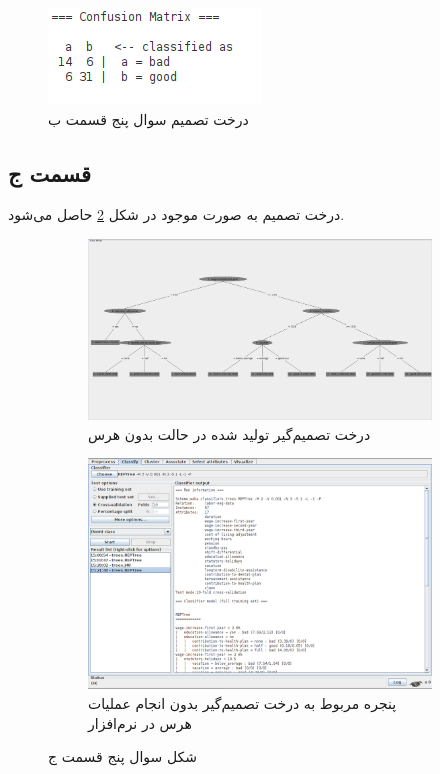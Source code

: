 \documentclass{article}
\begin{document}
\begin{figure}[h]
    \centering
    \includegraphics[scale=0.5]{images/q5/confusion_matrix.png}
    \caption{درخت تصمیم سوال پنج قسمت ب}
    \label{q5-confusion-matrix}
\end{figure}

\subsection*{قسمت ج}

درخت تصمیم به صورت موجود در شکل \ref{question5-partc} حاصل می‌شود.

\begin{figure}[h]
    \begin{subfigure}{0.48\linewidth}
        \includegraphics[width=\linewidth]{images/q5/tree_visualization_no_pruning.png}
        \caption{درخت تصمیم‌گیر تولید شده در حالت بدون هرس}
    \end{subfigure}
    \hfill
    \begin{subfigure}{0.48\linewidth}
        \includegraphics[width=\linewidth]{images/q5/weka_tree_generator_no_pruning.png}
        \caption{پنجره مربوط به درخت تصمیم‌گیر بدون انجام عملیات هرس در نرم‌افزار }
    \end{subfigure}
    \caption{شکل سوال پنج قسمت ج}
    \label{question5-partc}
\end{figure}
\end{document}
